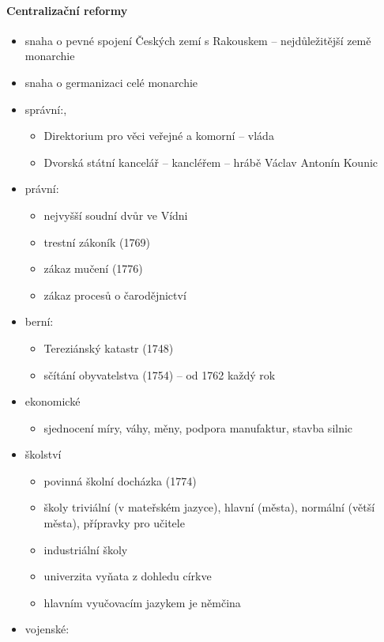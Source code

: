 \paragraph{Centralizační reformy}
\begin{itemize}
\item snaha o pevné spojení Českých zemí s Rakouskem -- nejdůležitější země monarchie
\item snaha o germanizaci celé monarchie
\item správní:, 
	\begin{itemize}
	\item  Direktorium pro věci veřejné a komorní -- vláda
	\item Dvorská státní kancelář -- kancléřem -- hrábě Václav Antonín Kounic
	\end{itemize}
\item právní:
	\begin{itemize}
	\item nejvyšší soudní dvůr ve Vídni
	\item trestní zákoník (1769)
	\item zákaz mučení (1776)
	\item zákaz procesů o čarodějnictví
	\end{itemize}
\item berní:
	\begin{itemize}
	\item Tereziánský katastr (1748)
	\item sčítání obyvatelstva (1754) -- od 1762 každý rok
	\end{itemize}
\item ekonomické
	\begin{itemize}
	\item sjednocení míry, váhy, měny, podpora manufaktur, stavba silnic
	\end{itemize}
\item školství
	\begin{itemize}
	\item povinná školní docházka (1774)
	\item školy triviální (v mateřském jazyce), hlavní (města), normální (větší města), přípravky pro učitele 
	\item industriální školy
	\item univerzita vyňata z dohledu církve
	\item hlavním vyučovacím jazykem je němčina
	\end{itemize}
\item vojenské:
	\begin{itemize}

\end{itemize}
\end{itemize}
